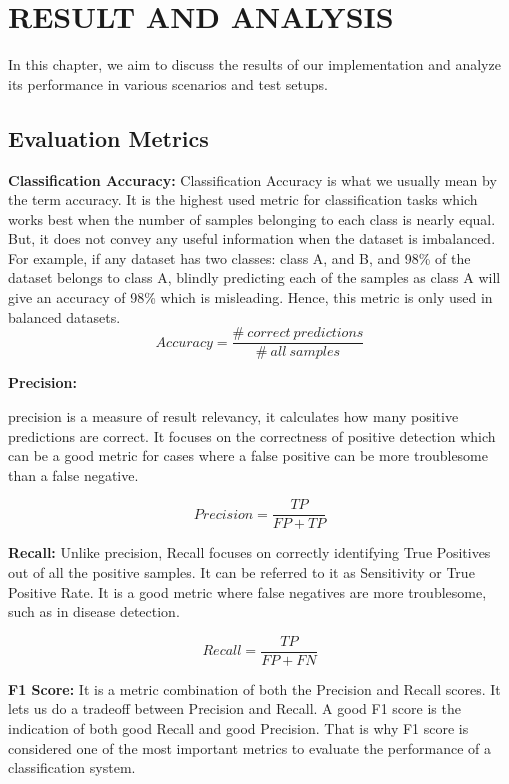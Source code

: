 \chapter{RESULT AND ANALYSIS}
 \label{Chapter 5}
 

In this chapter, we aim to discuss the results of our implementation and analyze its performance in various scenarios and test setups.

\section{Evaluation Metrics}

\textbf{Classification Accuracy:}
Classification Accuracy is what we usually mean by the term accuracy. It is the highest used metric for classification tasks which works best when the number of samples belonging to each class is nearly equal. But, it does not convey any useful information when the dataset is imbalanced. For example, if any dataset has two classes: class A, and B, and 98\% of the dataset belongs to class A, blindly predicting each of the samples as class A will give an accuracy of 98\% which is misleading. Hence, this metric is only used in balanced datasets.
\begin{equation}
    Accuracy = \frac{\#\:correct\:predictions}{\#\:all\:samples}
\end{equation}

\textbf{Precision:}

precision is a measure of result relevancy, it calculates how many positive predictions are correct. It focuses on the correctness of positive detection which can be a good metric for cases where a false positive can be more troublesome than a false negative. 

\[ Precision = \frac{TP}{FP + TP}\]

\textbf{Recall:}
Unlike precision, Recall focuses on correctly identifying True Positives out of all the positive samples. It can be referred to it as Sensitivity or True Positive Rate.  It is a good metric where false negatives are more troublesome, such as in disease detection.

\[ Recall = \frac{TP}{FP + FN}\]

\textbf{F1 Score:}
It is a metric combination of both the Precision and Recall scores. It lets us do a tradeoff between Precision and Recall. A good F1 score is the indication of both good Recall and good Precision. That is why F1 score is considered one of the most important metrics to evaluate the performance of a classification system.


